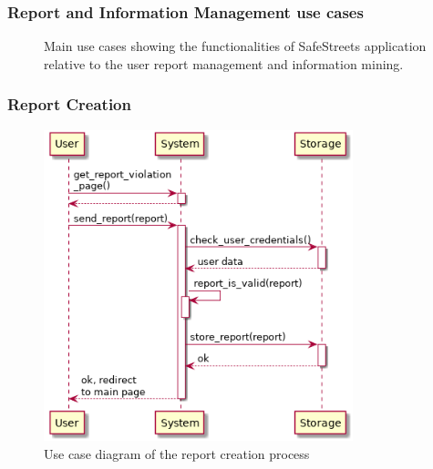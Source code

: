 \subsubsection{Report and Information Management use cases}
\begin{figure}[htp] 
	\caption{Main use cases showing the functionalities of SafeStreets application relative to the user report management and information mining.} 
	\label{fig:reportmanagement} 
\end{figure}

\newpage
\subsubsection{Report Creation}

\newpage
\begin{figure}[htp]
	\centering
	\includegraphics[width=0.8\textwidth]{images/useCases/creation_of_new_report.png}
	\caption{Use case diagram of the report creation process}
	\label{fig:reportmanagement}
\end{figure}
\newpage
